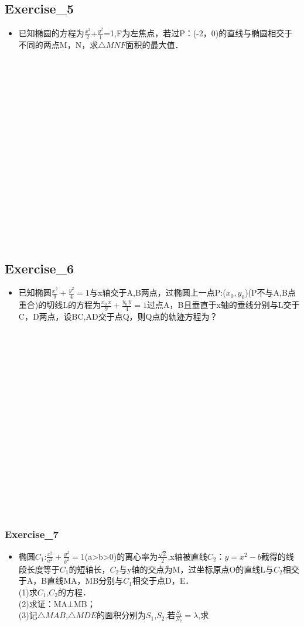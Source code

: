 \subsection{Exercise_5}
\begin{itemize}
\item 已知椭圆的方程为$\frac{x^2}{2}$+$\frac{y^2}{1}$=1,F为左焦点，若过P：(-2，0)的直线与椭圆相交于不同的两点M，N，求$\triangle MNF$面积的最大值．\\
\end{itemize}
\\ \\ \\ \\ \\ \\ \\ \\ \\ \\ \\ \\ \\ \\ \\ \\
\subsection{Exercise_6}
\begin{itemize}
\item 已知椭圆$\frac{x^2}{9}+\frac{y^2}{4}=1$与x轴交于A,B两点，过椭圆上一点P:($x_0,y_0$)(P不与A,B点重合)的切线L的方程为$\frac{x_0\,x}{9}+\frac{y_0\,y}{4}=1$过点A，B且垂直于x轴的垂线分别与L交于C，D两点，设BC,AD交于点Q，则Q点的轨迹方程为？\\
\end{itemize}
\\ \\ \\ \\ \\ \\ \\ \\ \\ \\ \\ \\ \\ \\ \\ \\
\subsubsection{Exercise_7}
\begin{itemize}
\item 椭圆$C_1$:$\frac{x^2}{a^2}+\frac{y^2}{b^2}=1$(a>b>0)的离心率为$\frac{\sqrt{2}}{2}$,x轴被直线$C_2$：$y=x^2-b$截得的线段长度等于$C_1$的短轴长，$C_2$与y轴的交点为M，过坐标原点O的直线L与$C_2$相交于A，B直线MA，MB分别与$C_1$相交于点D，E．\\
(1)求$C_1$,$C_2$的方程．\\
(2)求证：MA$\bot$MB；\\
(3)记$\triangle MAB$,$\triangle MDE$的面积分别为$S_1$,$S_2$,若$\frac{S_1}{S_2}=\lambda$,求
\end{itemize}
